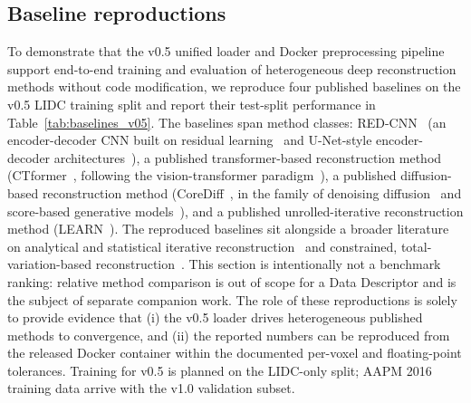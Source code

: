 \documentclass[twoside,11pt]{article}
\begin{document}
\subsection*{Baseline reproductions}
To demonstrate that the v0.5 unified loader and Docker preprocessing pipeline support end-to-end training and evaluation of heterogeneous deep reconstruction methods without code modification, we reproduce four published baselines on the v0.5 LIDC training split and report their test-split performance in Table~\ref{tab:baselines_v05}. The baselines span method classes: RED-CNN~\citep{chen2017redcnn} (an encoder-decoder CNN built on residual learning~\citep{he2016deep} and U-Net-style encoder-decoder architectures~\citep{ronneberger2015unet}), a published transformer-based reconstruction method (CTformer~\citep{ctformer2023}, following the vision-transformer paradigm~\citep{dosovitskiy2021image}), a published diffusion-based reconstruction method (CoreDiff~\citep{corediff2023}, in the family of denoising diffusion~\citep{ho2020denoising} and score-based generative models~\citep{song2021scorebased}), and a published unrolled-iterative reconstruction method (LEARN~\citep{learn2018}). The reproduced baselines sit alongside a broader literature on analytical and statistical iterative reconstruction~\citep{geyer2015state,thibault2007threedimensional,kim2019smoothing} and constrained, total-variation-based reconstruction~\citep{sidky2008image}. This section is intentionally not a benchmark ranking: relative method comparison is out of scope for a Data Descriptor and is the subject of separate companion work. The role of these reproductions is solely to provide evidence that (i) the v0.5 loader drives heterogeneous published methods to convergence, and (ii) the reported numbers can be reproduced from the released Docker container within the documented per-voxel and floating-point tolerances. Training for v0.5 is planned on the LIDC-only split; AAPM 2016 training data arrive with the v1.0 validation subset.
\end{document}
